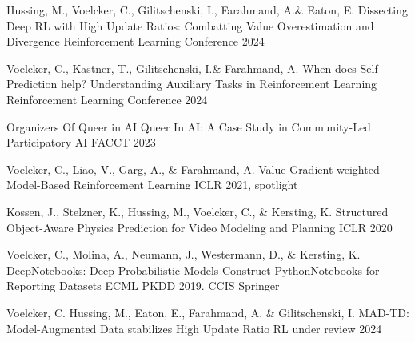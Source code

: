 

\begin{cventries}

  \cventry
    {Hussing, M., Voelcker, C., Gilitschenski, I., Farahmand, A.\& Eaton, E.} %
    {Dissecting Deep RL with High Update Ratios: Combatting Value Overestimation and Divergence}
    {Reinforcement Learning Conference 2024} %
    {} %
    {
    }

  \cventry
    {Voelcker, C., Kastner, T., Gilitschenski, I.\& Farahmand, A.} %
    {When does Self-Prediction help? Understanding Auxiliary Tasks in Reinforcement Learning}
    {Reinforcement Learning Conference 2024} %
    {} %
    {
    }

  \cventry
    {Organizers Of Queer in AI}
    {Queer In AI: A Case Study in Community-Led Participatory AI} %
    {FACCT 2023} %
    {} %
    {
    }

  \cventry
    {Voelcker, C., Liao, V., Garg, A., \& Farahmand, A.} %
    {Value Gradient weighted Model-Based Reinforcement Learning} %
    {ICLR 2021, spotlight} %
    {} %
    {
    }

  \cventry
    {Kossen, J., Stelzner, K., Hussing, M., Voelcker, C., \& Kersting, K.} %
    {Structured Object-Aware Physics Prediction for Video Modeling and Planning} %
    {ICLR 2020} %
    {} %
    {
    }

  \cventry
    {Voelcker, C., Molina, A., Neumann, J., Westermann, D., \& Kersting, K.} %
    {DeepNotebooks: Deep Probabilistic Models Construct PythonNotebooks for Reporting Datasets} %
    {ECML PKDD 2019. CCIS Springer} %
    {} %
    {
    }

\end{cventries}

  \cventry
    {Voelcker, C. Hussing, M., Eaton, E., Farahmand, A. \& Gilitschenski, I.} %
    {MAD-TD: Model-Augmented Data stabilizes High Update Ratio RL}
    {under review 2024} %
    {} %
    {
    }

